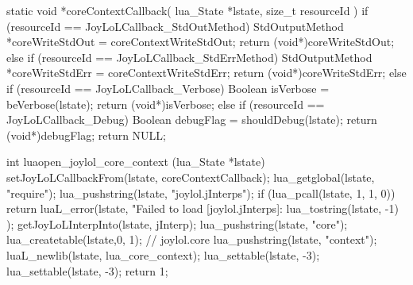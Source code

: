 static void *coreContextCallback(
  lua_State *lstate,
  size_t resourceId
) {
  if (resourceId == JoyLoLCallback_StdOutMethod) {
    StdOutputMethod *coreWriteStdOut =
      coreContextWriteStdOut;
    return (void*)coreWriteStdOut;
  } else if (resourceId == JoyLoLCallback_StdErrMethod) {
    StdOutputMethod *coreWriteStdErr =
      coreContextWriteStdErr;
    return (void*)coreWriteStdErr;
  } else if (resourceId == JoyLoLCallback_Verbose) {
    Boolean isVerbose = beVerbose(lstate);
    return (void*)isVerbose;
  } else if (resourceId == JoyLoLCallback_Debug) {
    Boolean debugFlag = shouldDebug(lstate);
    return (void*)debugFlag;
  }
  return NULL;
}
\stopCCode

\startCCode
int luaopen_joylol_core_context (lua_State *lstate) {
  setJoyLoLCallbackFrom(lstate, coreContextCallback);
  lua_getglobal(lstate, "require");
  lua_pushstring(lstate, "joylol.jInterps");
  if (lua_pcall(lstate, 1, 1, 0)) {
    return luaL_error(lstate,
      "Failed to load [joylol.jInterps]\nERROR:\n%
      lua_tostring(lstate, -1)
    );
  }
  getJoyLoLInterpInto(lstate, jInterp);
  lua_pushstring(lstate, "core");
  lua_createtable(lstate,0, 1); // joylol.core 
  lua_pushstring(lstate, "context");
  luaL_newlib(lstate, lua_core_context);
  lua_settable(lstate, -3);
  lua_settable(lstate, -3);
  return 1;
}
\stopCCode